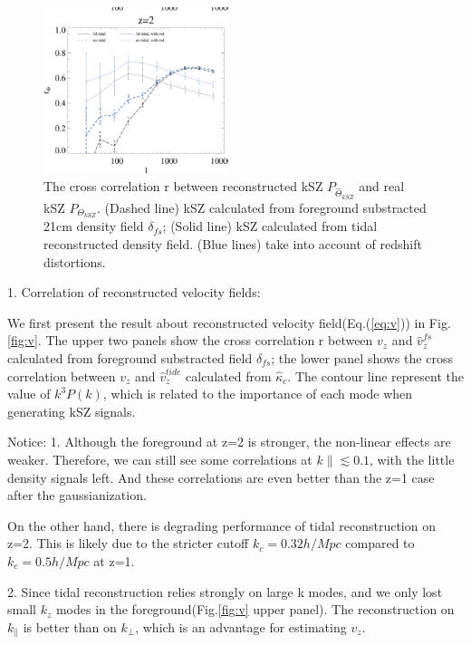 \begin{figure}[tbp]
\begin{center}
\includegraphics[width=0.48\textwidth]{cl_correlation_z1_z2.eps}
\end{center}
\vspace{-0.7cm}
\caption{The cross correlation r between reconstructed kSZ $P_{\hat \Theta_{kSZ}}$ 
and real kSZ $P_{\Theta_{kSZ}}$.
    (Dashed line) kSZ calculated from foreground substracted 21cm density field $\delta_{fs}$;
    (Solid line) kSZ calculated from tidal reconstructed density field.
    (Blue lines) take into account of redshift distortions.
}
\label{fig:r}
\end{figure}
1. Correlation of reconstructed velocity fields: 

We first present the result about reconstructed velocity field(Eq.(\ref{eq:v})) in Fig.\ref{fig:v}.
The upper two panels show the cross correlation r between $v_z$ and 
$\hat v_z^{fs}$ calculated from foreground substracted field $\delta_{fs}$; 
the lower panel shows the cross correlation between $v_z$ and $\hat v_z^{tide}$ calculated from $\hat \kappa_c$. 
The contour line represent the value of $k^3 P(k)$, which is related to the importance of each mode when generating kSZ signals.

Notice: 1. Although the foreground at z=2 is stronger, 
the non-linear effects are weaker.  
Therefore, we can still see some correlations at $k\parallel \lesssim 0.1$, with the little density signals left. 
And these correlations are even better than the z=1 case after the gaussianization.

On the other hand, there is degrading performance of tidal reconstruction on z=2. 
This is likely due to the stricter cutoff $k_c=0.32 h/Mpc$ compared to $k_c=0.5 h/Mpc$ at z=1.

2. Since tidal reconstruction relies strongly on large k modes, and we only lost small $k_z$ modes in the foreground(Fig.\ref{fig:v} upper panel). 
The reconstruction on $k_\parallel$ is better than on $k_\perp$, which is an advantage for estimating $v_z$.

